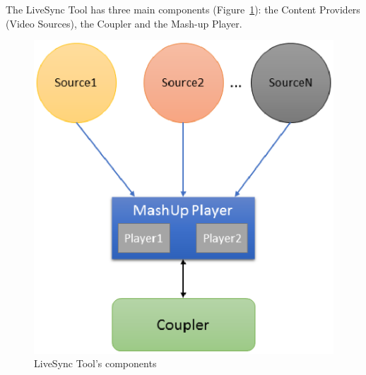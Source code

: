 The LiveSync Tool has three main components (Figure~\ref{livesync}): the Content Providers (Video Sources), the Coupler and the Mash-up Player.

\begin{figure}[h]
	\centerline{\includegraphics[scale=0.6] {figures/architecture}}
	\caption{LiveSync Tool's components}
	\label{livesync}
\end{figure}